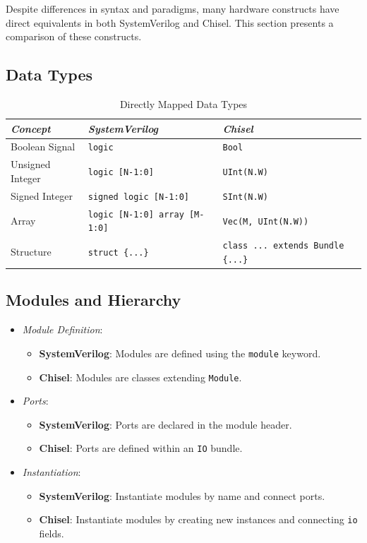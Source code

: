 Despite differences in syntax and paradigms, many hardware constructs have direct equivalents in both SystemVerilog and Chisel. This section presents a comparison of these constructs.

\subsection{Data Types}

\begin{table}[h!]
\centering
\begin{tabular}{|l|l|l|}
\hline
\textit{Concept} & \textit{SystemVerilog} & \textit{Chisel} \\
\hline
Boolean Signal & \texttt{logic} & \texttt{Bool} \\
Unsigned Integer & \texttt{logic [N-1:0]} & \texttt{UInt(N.W)} \\
Signed Integer & \texttt{signed logic [N-1:0]} & \texttt{SInt(N.W)} \\
Array & \texttt{logic [N-1:0] array [M-1:0]} & \texttt{Vec(M, UInt(N.W))} \\
Structure & \texttt{struct \{...\}} & \texttt{class ... extends Bundle \{...\}} \\
\hline
\end{tabular}
\caption{Directly Mapped Data Types}
\end{table}

\subsection{Modules and Hierarchy}

\begin{itemize}
    \item \textit{Module Definition}:
        \begin{itemize}
            \item \textbf{SystemVerilog}: Modules are defined using the \texttt{module} keyword.
            \item \textbf{Chisel}: Modules are classes extending \texttt{Module}.
        \end{itemize}
    \item \textit{Ports}:
        \begin{itemize}
            \item \textbf{SystemVerilog}: Ports are declared in the module header.
            \item \textbf{Chisel}: Ports are defined within an \texttt{IO} bundle.
        \end{itemize}
    \item \textit{Instantiation}:
        \begin{itemize}
            \item \textbf{SystemVerilog}: Instantiate modules by name and connect ports.
            \item \textbf{Chisel}: Instantiate modules by creating new instances and connecting \texttt{io} fields.
        \end{itemize}
\end{itemize}

